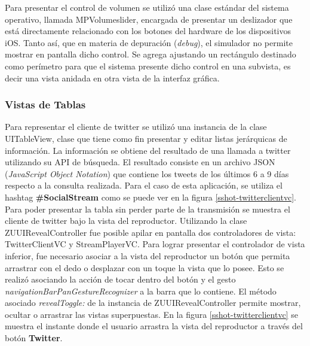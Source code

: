 		Para presentar el control de volumen se utilizó una clase estándar del sistema operativo, llamada MPVolumeslider, encargada de presentar un deslizador que está directamente relacionado con los botones del hardware de los dispositivos iOS. Tanto así, que en materia de depuración (\textit{debug}), el simulador no permite mostrar en pantalla dicho control. Se agrega ajustando un rectángulo destinado como perímetro para que el sistema presente dicho control en una subvista, es decir una vista anidada en otra vista de la interfaz gráfica.
		
		\subsubsection{Vistas de Tablas}
Para representar el cliente de twitter se utilizó una instancia de la clase UITableView, clase que tiene como fin presentar y editar listas jerárquicas de información. La información se obtiene del resultado de una llamada a twitter utilizando su API de búsqueda. El resultado consiste en un archivo JSON (\textit{JavaScript Object Notation}) que contiene los tweets de los últimos 6 a 9 días respecto a la consulta realizada. Para el caso de esta aplicación, se utiliza el hashtag \textbf{\#SocialStream} como se puede ver en la figura \ref{sshot-twitterclientvc}.\\

Para poder presentar la tabla sin perder parte de la transmisión se muestra el cliente de twitter bajo la vista del reproductor. Utilizando la clase ZUUIRevealController fue posible apilar en pantalla dos controladores de vista: TwitterClientVC y StreamPlayerVC. Para lograr presentar el controlador de vista inferior, fue necesario asociar a la vista del reproductor un botón que permita arrastrar con el dedo o desplazar con un toque la vista que lo posee. Esto se realizó asociando la acción de tocar dentro del botón y el gesto \textit{navigationBarPanGestureRecognizer} a la barra que lo contiene. El método asociado \textit{revealToggle:} de la instancia de ZUUIRevealController permite mostrar, ocultar o arrastrar las vistas superpuestas. En la figura \ref{sshot-twitterclientvc} se muestra el instante donde el usuario arrastra la vista del reproductor a través del botón \textbf{Twitter}.


